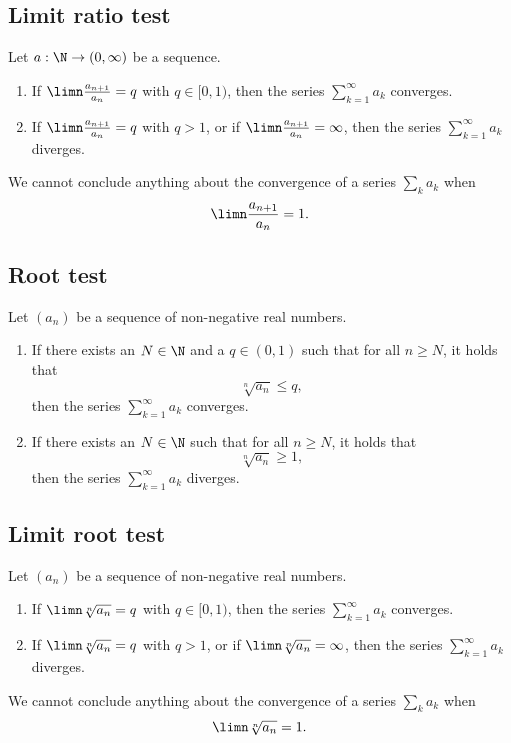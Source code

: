 \subsection{Limit ratio test}
\begin{theorem}
    Let $a: \N \to (0, \infty)$ be a sequence.
    \begin{enumerate}
        \item If $\limn \frac{a_{n+1}}{a_n} = q$ with $q \in [0,1)$, then the series $\sum_{k=1}^\infty a_k$ converges.
        \item If $\limn \frac{a_{n+1}}{a_n} = q$ with $q > 1$, or if $\limn \frac{a_{n+1}}{a_n} = \infty$, then the series $\sum_{k=1}^\infty a_k$ diverges.
    \end{enumerate}
\end{theorem}

\begin{remark}
    We cannot conclude anything about the convergence of a series $\sum_{k }^{}a_k$ when
    $$\limn \frac{a_{n+1}}{a_n} = 1.$$
\end{remark}

\subsection{Root test}
\begin{theorem}
    Let $(a_n)$ be a sequence of non-negative real numbers.
    \begin{enumerate}
        \item If there exists an $N \in \N$ and a $q \in (0,1)$ such that for all $n \ge N$, it holds that
            $$\sqrt[n]{a_n} \le q,$$
            then the series $\sum_{k=1}^\infty a_k$ converges.
        \item If there exists an $N \in \N$ such that for all $n \ge N$, it holds that
            $$\sqrt[n]{a_n} \ge 1,$$
            then the series $\sum_{k=1}^\infty a_k$ diverges.
    \end{enumerate}
\end{theorem}

\subsection{Limit root test}
\begin{theorem}
    Let $(a_n)$ be a sequence of non-negative real numbers.
    \begin{enumerate}
        \item If $\limn \sqrt[n]{a_n} = q$ with $q \in [0,1)$, then the series $\sum_{k=1}^\infty a_k$ converges.
        \item If $\limn \sqrt[n]{a_n} = q$ with $q > 1$, or if $\limn \sqrt[n]{a_n} = \infty$, then the series $\sum_{k=1}^\infty a_k$ diverges.
    \end{enumerate}
\end{theorem}

\begin{remark}
    We cannot conclude anything about the convergence of a series $\sum_{k }^{}a_k$ when
    $$\limn \sqrt[n]{a_n} = 1.$$
\end{remark}
